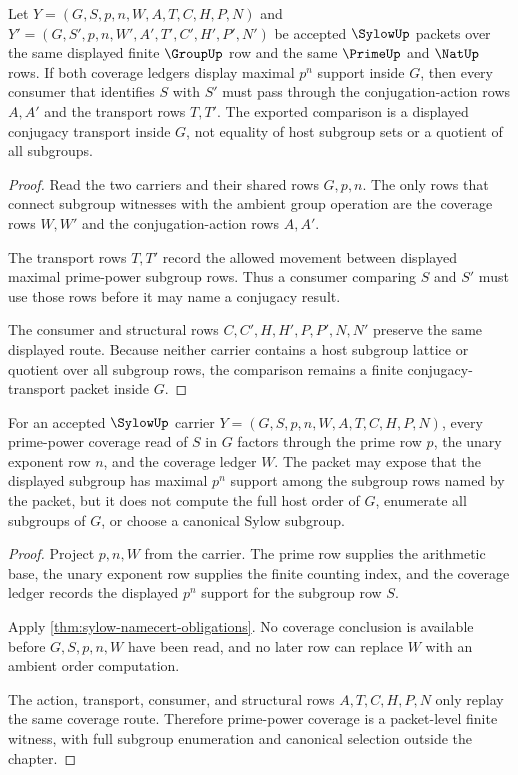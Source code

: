 \begin{theorem}
\label{thm:sylow-conjugacy-transport}
Let $Y=(G,S,p,n,W,A,T,C,H,P,N)$ and $Y'=(G,S',p,n,W',A',T',C',H',P',N')$ be accepted $\SylowUp$ packets over the same displayed finite $\GroupUp$ row and the same $\PrimeUp$ and $\NatUp$ rows. If both coverage ledgers display maximal $p^{n}$ support inside $G$, then every consumer that identifies $S$ with $S'$ must pass through the conjugation-action rows $A,A'$ and the transport rows $T,T'$. The exported comparison is a displayed conjugacy transport inside $G$, not equality of host subgroup sets or a quotient of all subgroups.
\end{theorem}
\begin{proof}
Read the two carriers and their shared rows $G,p,n$. The only rows that connect subgroup witnesses with the ambient group operation are the coverage rows $W,W'$ and the conjugation-action rows $A,A'$.

The transport rows $T,T'$ record the allowed movement between displayed maximal prime-power subgroup rows. Thus a consumer comparing $S$ and $S'$ must use those rows before it may name a conjugacy result.

The consumer and structural rows $C,C',H,H',P,P',N,N'$ preserve the same displayed route. Because neither carrier contains a host subgroup lattice or quotient over all subgroup rows, the comparison remains a finite conjugacy-transport packet inside $G$.
\end{proof}

\begin{theorem}
\label{thm:sylow-prime-power-coverage}
For an accepted $\SylowUp$ carrier $Y=(G,S,p,n,W,A,T,C,H,P,N)$, every prime-power coverage read of $S$ in $G$ factors through the prime row $p$, the unary exponent row $n$, and the coverage ledger $W$. The packet may expose that the displayed subgroup has maximal $p^{n}$ support among the subgroup rows named by the packet, but it does not compute the full host order of $G$, enumerate all subgroups of $G$, or choose a canonical Sylow subgroup.
\end{theorem}
\begin{proof}
Project $p,n,W$ from the carrier. The prime row supplies the arithmetic base, the unary exponent row supplies the finite counting index, and the coverage ledger records the displayed $p^{n}$ support for the subgroup row $S$.

Apply \autoref{thm:sylow-namecert-obligations}. No coverage conclusion is available before $G,S,p,n,W$ have been read, and no later row can replace $W$ with an ambient order computation.

The action, transport, consumer, and structural rows $A,T,C,H,P,N$ only replay the same coverage route. Therefore prime-power coverage is a packet-level finite witness, with full subgroup enumeration and canonical selection outside the chapter.
\end{proof}

